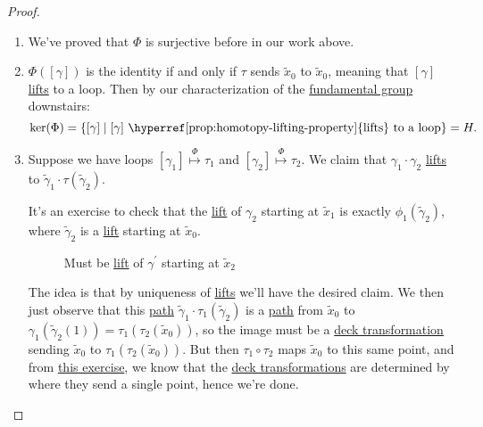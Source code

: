 \begin{proof}
	\begin{enumerate}
		\item We've proved that \(\Phi \) is surjective before in our work above.
		\item \(\Phi ([\gamma ])\) is the identity if and only if \(\tau \) sends \(\widetilde{x} _0\) to \(\widetilde{x} _0\), meaning that \([\gamma ]\)
		      \hyperref[prop:homotopy-lifting-property]{lifts} to a loop. Then by our characterization of the \hyperref[def:fundamental-group]{fundamental group} downstairs:
		      \[
			      \mathrm{ker}(\Phi ) = \left\{[\gamma ] \mid \text{\([\gamma ]\) \hyperref[prop:homotopy-lifting-property]{lifts} to a loop} \right\} = H.
		      \]
		\item Suppose we have loops \([\gamma _1]\overset{\Phi }{\mapsto } \tau _1\) and \([\gamma _2]\overset{\Phi }{\mapsto }\tau _2\). We claim that \(\gamma _1\cdot \gamma _2\)
		      \hyperref[prop:homotopy-lifting-property]{lifts} to \(\widetilde{\gamma} _1\cdot \tau (\widetilde{\gamma} _2)\).
		      \begin{figure}[H]
			      \centering
			      \label{fig:pf:prop:lec17-1}
		      \end{figure}
		      It's an exercise to check that the \hyperref[prop:homotopy-lifting-property]{lift} of \(\gamma _2\) starting at \(\widetilde{x} _1\) is exactly
		      \(\phi _1(\widetilde{\gamma} _2)\), where \(\widetilde{\gamma} _2\) is a \hyperref[prop:homotopy-lifting-property]{lift} starting at \(\widetilde{x} _0\).
		      \begin{figure}[H]
			      \centering
			      \caption{Must be \hyperref[prop:homotopy-lifting-property]{lift} of \(\gamma ^\prime \) starting at \(\widetilde{x} _2\)}
			      \label{fig:pf:prop:lec17-2}
		      \end{figure}
		      The idea is that by uniqueness of \hyperref[prop:homotopy-lifting-property]{lifts} we'll have the desired claim. We then just observe that
		      this \hyperref[def:path]{path} \(\widetilde{\gamma} _1\cdot \tau _1(\widetilde{\gamma} _2)\) is a \hyperref[def:path]{path} from \(\widetilde{x} _0\)
		      to \(\gamma_1(\widetilde{\gamma} _2(1)) = \tau_1(\tau _2(\widetilde{x} _0))\), so the image must be a \hyperref[def:deck-transformation]{deck transformation}
		      sending \(\widetilde{x} _0\) to \(\tau _1(\tau _2(\widetilde{x} _0))\). But then \(\tau _1\circ \tau _2\) maps \(\widetilde{x} _0\)
		      to this same point, and from \hyperref[ex:lec17]{this exercise}, we know that the \hyperref[def:deck-transformation]{deck transformations} are determined by
		      where they send a single point, hence we're done.
	\end{enumerate}
\end{proof}

